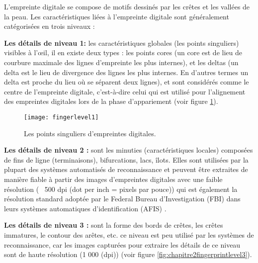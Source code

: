 L'empreinte digitale se compose de motifs dessinés par les crêtes et les vallées de la peau. Les caractéristiques liées à l'empreinte digitale sont généralement catégorisées en trois niveaux \citep{hasan2013fingerprint} :
\begin{enumerate}
	
	\noindent\begin{minipage}{0.7\textwidth}%
		\item 	\textbf{Les détails de niveau 1: }les caractéristiques globales (les points singuliers) visibles à l'œil, il en existe deux types : les points cores (un core est de lieu de courbure maximale des lignes d'empreinte les plus internes), et les deltas (un delta est le lieu de divergence des lignes les plus internes. En d'autres termes un delta est proche du lieu où se séparent deux lignes), et sont considérés comme le centre de l'empreinte digitale, c'est-à-dire celui qui est utilisé pour l'alignement des empreintes digitales lors de la phase d'appariement (voir figure \ref{fig:chapitre2fingerprintlevel1}).   
		
	\end{minipage}%
	\hfill%
	\begin{minipage}{0.3\textwidth}\raggedleft
	 
		\begin{center}
			\begin{figure}[H]
				\centering
				\texttt{[image: fingerlevel1]}
				\captionsetup{justification=centering}
				\caption{Les points singuliers d'empreintes digitales.}
				\label{fig:chapitre2fingerprintlevel1}
			\end{figure}
		\end{center}
		
	\end{minipage}%
	\item \textbf{Les détails de niveau 2 : }sont les minuties (caractéristiques locales) composées de fins de ligne (terminaisons), bifurcations, lacs, îlots. Elles sont utilisées par la plupart des systèmes automatisés de reconnaissance et peuvent être extraites de manière fiable à partir des images d'empreintes digitales avec une faible résolution (~ 500 dpi (dot per inch = pixels par pouce)) qui est également la résolution standard adoptée par le Federal Bureau d'Investigation (FBI) dans leurs systèmes automatiques d'identification (AFIS) \citep{jain2007pores}.
	
	
	\item \textbf{Les détails de niveau 3 :} sont la forme des bords de crêtes, les crêtes immatures, le contour des arêtes, etc. ce niveau est peu utilisé par les systèmes de reconnaissance, car les images capturées pour extraire les détails de ce niveau sont de haute résolution (1 000 (dpi)) (voir figure \ref{fig:chapitre2fingerprintlevel3}). 
	

\end{enumerate}
